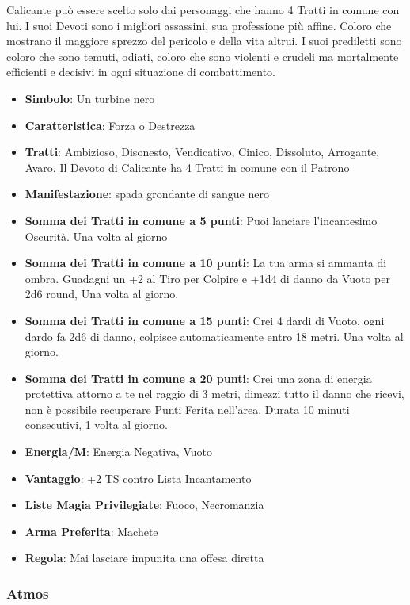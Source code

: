 \begin{multicols}{2}
Calicante può essere scelto solo dai personaggi che hanno 4 Tratti in comune con lui. I suoi Devoti sono i migliori assassini, sua professione più affine. Coloro che mostrano il maggiore sprezzo del pericolo e della vita altrui. I suoi prediletti sono coloro che sono temuti, odiati, coloro che sono violenti e crudeli ma mortalmente efficienti e decisivi in ogni situazione di combattimento.

\begin{itemize}[leftmargin=*] \setlength{\itemsep}{0pt}
\item \textbf{Simbolo}: Un turbine nero
\item \textbf{Caratteristica}: Forza o Destrezza
\item \textbf{Tratti}: Ambizioso, Disonesto, Vendicativo, Cinico, Dissoluto, Arrogante, Avaro. Il Devoto di Calicante ha 4 Tratti in comune con il Patrono
\item \textbf{Manifestazione}: spada grondante di sangue nero
\item \textbf{Somma dei Tratti in comune a 5 punti}: Puoi lanciare l'incantesimo Oscurità. Una volta al giorno
\item \textbf{Somma dei Tratti in comune a 10 punti}: La tua arma si ammanta di ombra. Guadagni un +2 al Tiro per Colpire e +1d4 di danno da Vuoto per 2d6 round, Una volta al giorno.
\item \textbf{Somma dei Tratti in comune a 15 punti}: Crei 4 dardi di Vuoto, ogni dardo fa 2d6 di danno, colpisce automaticamente entro 18 metri. Una volta al giorno.
\item \textbf{Somma dei Tratti in comune a 20 punti}: Crei una zona di energia protettiva attorno a te nel raggio di 3 metri, dimezzi tutto il danno che ricevi, non è possibile recuperare Punti Ferita nell'area. Durata 10 minuti consecutivi, 1 volta al giorno.
\item \textbf{Energia/M}: Energia Negativa, Vuoto
\item \textbf{Vantaggio}: +2 TS contro Lista Incantamento
\item \textbf{Liste Magia Privilegiate}: Fuoco, Necromanzia
\item \textbf{Arma Preferita}: Machete
\item \textbf{Regola}: Mai lasciare impunita una offesa diretta
\end{itemize}

\subsubsection{Atmos}\label{atmos}\hypertarget{atmos}{}


\end{multicols}
